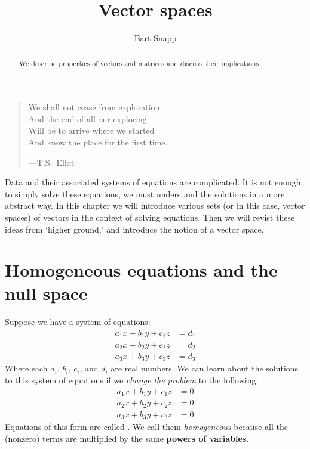 \documentclass{ximera}
\author{Bart Snapp}
\title{Vector spaces}
\begin{document}
\begin{abstract}
  We describe properties of vectors and matrices and discuss their
  implications.
\end{abstract}
\maketitle

\begin{quote}
  We shall not cease from exploration\\
And the end of all our exploring\\
Will be to arrive where we started\\
And know the place for the first time.


  \hfill ---T.S.\ Eliot
\end{quote}


Data and their associated systems of equations are complicated. It is
not enough to simply solve these equations, we must understand the
solutions in a more abstract way. In this chapter we will introduce
various sets (or in this case, vector spaces) of vectors in the
context of solving equations. Then we will revist these ideas from
`higher ground,' and introduce the notion of a vector space.



\section{Homogeneous equations and the null space}

Suppose we have a system of equations:
\begin{align*}
  a_1 x + b_1 y + c_1 z &= d_1\\
  a_2 x + b_2 y + c_2 z &= d_2\\
  a_3 x + b_3 y + c_3 z &= d_3
\end{align*}
Where each $a_i$, $b_i$, $c_i$, and $d_i$ are real numbers. We can
learn about the solutions to this system of equations if we
\textit{change the problem} to the following:
\begin{align*}
  a_1 x + b_1 y + c_1 z &= 0  \\
  a_2 x + b_2 y + c_2 z &= 0  \\
  a_3 x + b_3 y + c_3 z &= 0
\end{align*}
Equations of this form are called . We call
them \textit{homogeneous} because all the (nonzero) terms are
multiplied by the same \textbf{powers of variables}.
\end{document}
